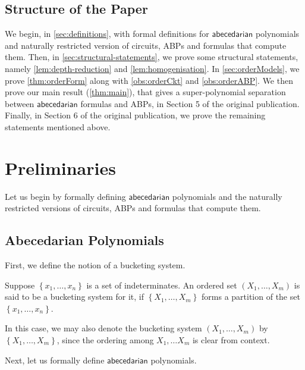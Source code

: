 \documentclass[10pt,a4paper]{article}
\def\set#1{\left\{ #1 \right\}}
\newcommand{\abcd}{\mathsf{abecedarian}}
\begin{document}
\subsection{Structure of the Paper}

We begin, in \autoref{sec:definitions}, with formal definitions for $\abcd$ polynomials and naturally restricted version of circuits, ABPs and formulas that compute them.
Then, in \autoref{sec:structural-statements}, we prove some structural statements, namely \autoref{lem:depth-reduction} and \autoref{lem:homogenisation}.
In \autoref{sec:orderModels}, we prove \autoref{thm:orderForm} along with \autoref{obs:orderCkt} and \autoref{obs:orderABP}.
We then prove our main result (\autoref{thm:main}), that gives a super-polynomial separation between $\abcd$ formulas and ABPs, in Section 5 of the original publication.
Finally, in Section 6 of the original publication, we prove the remaining statements mentioned above.

%


\section{Preliminaries}\label{sec:definitions}

Let us begin by formally defining $\abcd$ polynomials and the naturally restricted versions of circuits, ABPs and formulas that compute them.

\subsection{Abecedarian Polynomials}\label{sec:defn_abcd_poly}

First, we define the notion of a bucketing system.

\begin{definition}
	Suppose $\set{x_1, \ldots, x_n}$ is a set of indeterminates.
	An ordered set $(X_1, \ldots, X_m)$ is said to be a bucketing system for it, if $\set{X_1, \ldots, X_m}$ forms a partition of the set $\set{x_1, \ldots, x_n}$.

	In this case, we may also denote the bucketing system $(X_1, \ldots, X_m)$ by $\set{X_1, \ldots, X_m}$, since the ordering among $X_1, \ldots X_m$ is clear from context.	
\end{definition}

\noindent Next, let us formally define $\abcd$ polynomials. 
\end{document}
